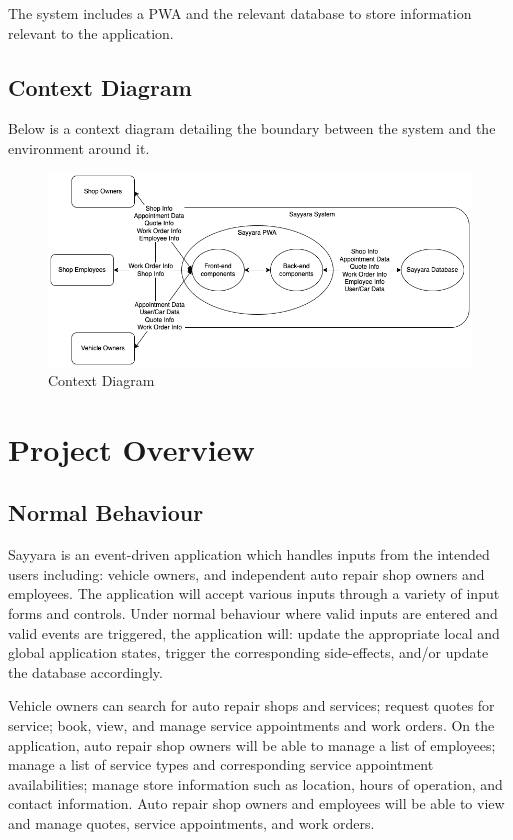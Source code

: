 \documentclass[12pt, titlepage]{article}
\begin{document}
The system includes a PWA and the relevant database to store information relevant to the
application.

\subsection{Context Diagram}

Below is a context diagram detailing the boundary between the system and the environment around it.

\begin{figure}[H]
	\centering
	\includegraphics[width=\textwidth]{./diagrams/ContextDiagram.png}
	\caption{Context Diagram}
	\label{ContextDiagram}
\end{figure}


\section{Project Overview}

\subsection{Normal Behaviour}
Sayyara is an event-driven application which handles inputs from the intended users including:
vehicle owners, and independent auto repair shop owners and employees. The application will accept
various inputs through a variety of input forms and controls. Under normal behaviour where valid
inputs are entered and valid events are triggered, the application will: update the appropriate
local and global application states, trigger the corresponding side-effects, and/or update the
database accordingly.

Vehicle owners can search for auto repair shops and services; request quotes for service; book,
view, and manage service appointments and work orders. On the application, auto repair shop owners
will be able to manage a list of employees; manage a list of service types and corresponding
service appointment availabilities; manage store information such as location, hours of operation,
and contact information. Auto repair shop owners and employees will be able to view and manage
quotes, service appointments, and work orders.
\end{document}
